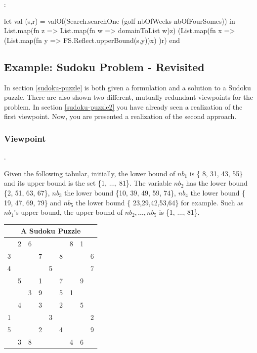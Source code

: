 \documentclass[a4paper,halfparskip]{scrartcl}
\begin{document}
:
\begin{myverbatim}
let 
    val (s,r) = valOf(Search.searchOne
                  (golf nbOfWeeks nbOfFourSomes))
in
    List.map(fn z =>
     List.map(fn w => domainToList w)z)
         (List.map(fn x => 
             (List.map(fn y => 
               FS.Reflect.upperBound(s,y))x)
         )r)
end
\end{myverbatim}



\newpage

\subsection{Example: Sudoku Problem - Revisited}
\label{sudoku-puzzle3}
In section \ref{sudoku-puzzle} is both given a formulation
and a solution to a Sudoku puzzle. There are also shown
two different, mutually redundant viewpoints for the problem.
In section \ref{sudoku-puzzle2} you have already seen a
realization of the first viewpoint. Now, you are presented
a realization of the second approach.

\subsubsection{Viewpoint}
.

Given the following tabular, initially, the lower bound of $nb_1$ is
\{ 8, 31, 43, 55\} and its upper bound is the set \{1, $\ldots$, 81\}. The variable
$nb_2$ has the lower bound \{2, 51, 63, 67\}, $nb_3$ the lower bound 
\{10, 39, 49, 59, 74\}, $nb_4$ the lower bound \{ 19, 47, 69, 79\} and 
$nb_5$ the lower bound \{ 23,29,42,53,64\} for example. Such as $nb_1$'s upper
bound, the upper bound of $nb_2, \ldots, nb_5$ is \{1, $\ldots$, 81\}.


\begin{tabular}{||c|c|c||c|c|c||c|c|c||}
\hline
\multicolumn{9}{||c||}{A Sudoku Puzzle}\\
\hline
\hline
  & 2 & 6 &   &   &   & 8 & 1 &  \\
\hline
3 &   &   & 7 &   & 8 &   &   & 6\\
\hline
4 &   &   &   & 5 &   &   &   & 7\\
\hline
\hline
  & 5 &   & 1 &   & 7 &   & 9 &  \\
\hline
  &   & 3 & 9 &   & 5 & 1 &   &  \\
\hline
  & 4 &   & 3 &   & 2 &   & 5 &  \\
\hline
\hline
1 &   &   &   & 3 &   &   &   & 2\\
\hline
5 &   &   & 2 &   & 4 &   &   & 9\\
\hline
  & 3 & 8 &   &   &   & 4 & 6 &  \\
\hline   
\end{tabular}
\end{document}
